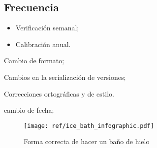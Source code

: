 \subsection{Frecuencia}

\begin{itemize}
	\item Verificación semanal;
	\item Calibración anual.
\end{itemize}

\begin{changelog}[simple, sectioncmd=\subsection*,label=changelog-\thesection-\MayorVer.\MenorVer]
	\begin{version}[v=\MayorVer.\MenorVer, date=2023--01, author=Pablo E. Alanis]
		\item Cambio de formato;
		\item Cambios en la serialización de versiones;
		\item Correcciones ortográficas y de estilo.
	\end{version}

	\begin{version}[v=1.7, date=2022--05, author=Alonso M.]
		\item cambio de fecha;
	\end{version}

\end{changelog}


\begin{figure}[p]
    \centering
    \texttt{[image: ref/ice\_bath\_infographic.pdf]}
    \caption[Forma correcta de hacer un baño de hielo]{Forma correcta de hacer un baño de hielo}
    \label{fig:IceBath}
\end{figure}